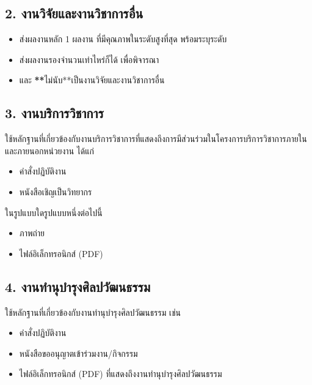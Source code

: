 \documentclass[a4paper,12pt,english]{sphinxmanual}
\begin{document}
\subsection{2. งานวิจัยและงานวิชาการอื่น}
\label{\detokenize{submission_part1:id6}}\begin{itemize}
\item {} 
ส่งผลงานหลัก 1 ผลงาน ที่มีคุณภาพในระดับสูงที่สุด พร้อมระบุระดับ

\item {} 
ส่งผลงานรองจำนวนเท่าไหร่ก็ได้ เพื่อพิจารณา

\item {} 
{\hyperref[\detokenize{glossary:term-0}]{}} และ {\hyperref[\detokenize{glossary:term-1}]{}} {\color{red}\bfseries{}**}ไม่นับ**เป็นงานวิจัยและงานวิชาการอื่น

\end{itemize}


\subsection{3. งานบริการวิชาการ}
\label{\detokenize{submission_part1:id9}}
ใช้หลักฐานที่เกี่ยวข้องกับงานบริการวิชาการที่แสดงถึงการมีส่วนร่วมในโครงการบริการวิชาการภายในและภายนอกหน่วยงาน ได้แก่
\begin{itemize}
\item {} 
คำสั่งปฏิบัติงาน

\item {} 
หนังสือเชิญเป็นวิทยากร

\end{itemize}

ในรูปแบบใดรูปแบบหนึ่งต่อไปนี้
\begin{itemize}
\item {} 
ภาพถ่าย

\item {} 
ไฟล์อิเล็กทรอนิกส์ (PDF)

\end{itemize}


\subsection{4. งานทำนุบำรุงศิลปวัฒนธรรม}
\label{\detokenize{submission_part1:id10}}
ใช้หลักฐานที่เกี่ยวข้องกับงานทำนุบำรุงศิลปวัฒนธรรม เช่น
\begin{itemize}
\item {} 
คำสั่งปฏิบัติงาน

\item {} 
หนังสือขออนุญาตเข้าร่วมงาน/กิจกรรม

\item {} 
ไฟล์อิเล็กทรอนิกส์ (PDF) ที่แสดงถึงงานทำนุบำรุงศิลปวัฒนธรรม

\end{itemize}
\end{document}
